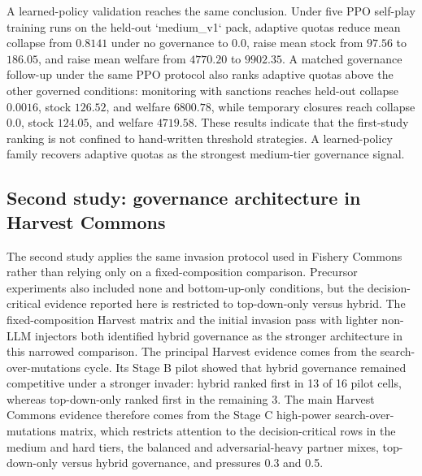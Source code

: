 A learned-policy validation reaches the same conclusion. Under five PPO self-play training runs on the held-out `medium\_v1` pack, adaptive quotas reduce mean collapse from \(0.8141\) under no governance to \(0.0\), raise mean stock from \(97.56\) to \(186.05\), and raise mean welfare from \(4770.20\) to \(9902.35\). A matched governance follow-up under the same PPO protocol also ranks adaptive quotas above the other governed conditions: monitoring with sanctions reaches held-out collapse \(0.0016\), stock \(126.52\), and welfare \(6800.78\), while temporary closures reach collapse \(0.0\), stock \(124.05\), and welfare \(4719.58\). These results indicate that the first-study ranking is not confined to hand-written threshold strategies. A learned-policy family recovers adaptive quotas as the strongest medium-tier governance signal.

\subsection{Second study: governance architecture in Harvest Commons}

The second study applies the same invasion protocol used in Fishery Commons rather than relying only on a fixed-composition comparison. Precursor experiments also included none and bottom-up-only conditions, but the decision-critical evidence reported here is restricted to top-down-only versus hybrid. The fixed-composition Harvest matrix and the initial invasion pass with lighter non-LLM injectors both identified hybrid governance as the stronger architecture in this narrowed comparison. The principal Harvest evidence comes from the search-over-mutations cycle. Its Stage B pilot showed that hybrid governance remained competitive under a stronger invader: hybrid ranked first in 13 of 16 pilot cells, whereas top-down-only ranked first in the remaining 3. The main Harvest Commons evidence therefore comes from the Stage C high-power search-over-mutations matrix, which restricts attention to the decision-critical rows in the medium and hard tiers, the balanced and adversarial-heavy partner mixes, top-down-only versus hybrid governance, and pressures 0.3 and 0.5.

